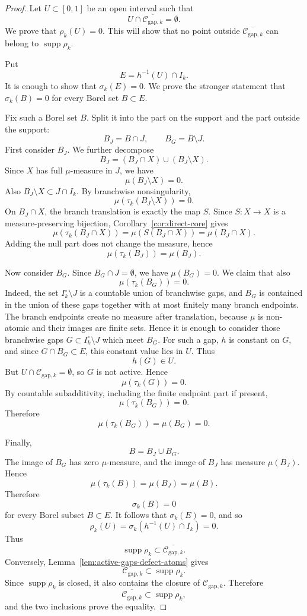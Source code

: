 \documentclass[11pt]{amsart}
\theoremstyle{plain}
\theoremstyle{definition}
\theoremstyle{remark}
\DeclareMathOperator{\supp}{supp}
\newcommand{\cC}{\mathcal C}
\begin{document}
\begin{proof}
Let \(U\subset[0,1]\) be an open interval such that
\[
        U\cap \overline{\cC_{\mathrm{gap},k}}=\emptyset.
\]
We prove that \(\rho_k(U)=0\). This will show that no point outside
\(\overline{\cC_{\mathrm{gap},k}}\) can belong to \(\supp\rho_k\).

Put
\[
        E=h^{-1}(U)\cap I_k.
\]
It is enough to show that \(\sigma_k(E)=0\). We prove the stronger statement that \(\sigma_k(B)=0\) for every Borel set \(B\subset E\).

Fix such a Borel set \(B\). Split it into the part on the support and the part outside the
support:
\[
        B_J=B\cap J,
        \qquad
        B_G=B\setminus J.
\]
First consider \(B_J\). We further decompose
\[
        B_J=(B_J\cap X)\cup (B_J\setminus X).
\]
Since \(X\) has full \(\mu\)-measure in \(J\), we have
\[
        \mu(B_J\setminus X)=0.
\]
Also \(B_J\setminus X\subset J\cap I_k\). By branchwise nonsingularity,
\[
        \mu(\tau_k(B_J\setminus X))=0.
\]
On \(B_J\cap X\), the branch translation is exactly the map \(S\). Since
\(S:X\to X\) is a measure-preserving bijection, Corollary~\ref{cor:direct-core}
gives
\[
        \mu(\tau_k(B_J\cap X))
        =
        \mu(S(B_J\cap X))
        =
        \mu(B_J\cap X).
\]
Adding the null part does not change the measure, hence
\[
        \mu(\tau_k(B_J))=\mu(B_J).
\]

Now consider \(B_G\). Since \(B_G\cap J=\emptyset\), we have \(\mu(B_G)=0\). We claim
that also
\[
        \mu(\tau_k(B_G))=0.
\]
Indeed, the set \(I_k^\circ\setminus J\) is a countable union of branchwise gaps, and
\(B_G\) is contained in the union of these gaps together with at most finitely many
branch endpoints. The branch endpoints create no measure after translation, because
\(\mu\) is non-atomic and their images are finite sets. Hence it is enough to consider
those branchwise gaps \(G\subset I_k^\circ\setminus J\) which meet \(B_G\).
For such a gap, \(h\) is constant on \(G\), and since \(G\cap B_G\subset E\), this
constant value lies in \(U\). Thus
\[
        h(G)\in U.
\]
But \(U\cap\cC_{\mathrm{gap},k}=\emptyset\), so \(G\) is not active. Hence
\[
        \mu(\tau_k(G))=0.
\]
By countable subadditivity, including the finite endpoint part if present,
\[
        \mu(\tau_k(B_G))=0.
\]
Therefore
\[
        \mu(\tau_k(B_G))=\mu(B_G)=0.
\]

Finally,
\[
        B=B_J\cup B_G.
\]
The image of \(B_G\) has zero \(\mu\)-measure, and the image of \(B_J\) has measure
\(\mu(B_J)\). Hence
\[
        \mu(\tau_k(B))=\mu(B_J)=\mu(B).
\]
Therefore
\[
        \sigma_k(B)=0
\]
for every Borel subset \(B\subset E\). It follows that \(\sigma_k(E)=0\), and so
\[
        \rho_k(U)=\sigma_k(h^{-1}(U)\cap I_k)=0.
\]
Thus
\[
        \supp\rho_k\subset \overline{\cC_{\mathrm{gap},k}}.
\]
Conversely, Lemma~\ref{lem:active-gaps-defect-atoms} gives
\[
        \cC_{\mathrm{gap},k}\subset \supp\rho_k.
\]
Since \(\supp\rho_k\) is closed, it also contains the closure of
\(\cC_{\mathrm{gap},k}\). Therefore
\[
        \overline{\cC_{\mathrm{gap},k}}\subset \supp\rho_k,
\]
and the two inclusions prove the equality.
\end{proof}
\end{document}
